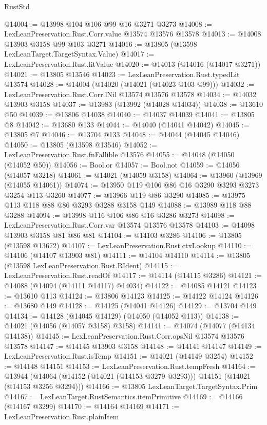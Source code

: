 \begin{lexlean}{RustStd}
\begin{coremodule}
@14004 := @13998 @104 @106 @99 @16 @3271 @3273
@14008 := LexLeanPreservation.Rust.Corr.value @13574 @13576 @13578
@14013 := @14008 @13903 @3158 @99 @103 @3271
@14016 := @13805 (@13598 LexLeanTarget.TargetSyntax.Value)
@14017 := LexLeanPreservation.Rust.litValue
@14020 := @14013 (@14016 (@14017 @3271))
@14021 := @13805 @13546
@14023 := LexLeanPreservation.Rust.typedLit @13574
@14028 := @14004 (@14020 (@14021 (@14023 @103 @99)))
@14032 := LexLeanPreservation.Rust.Corr.lNil @13574 @13576 @13578
@14034 := @14032 @13903 @3158
@14037 := @13983 (@13992 (@14028 @14034))
@14038 := @13610 @50
@14039 := @13806 @14038
@14040 := @14037 @14039
@14041 := @13805 @8
@14042 := @13680 @133
@14044 := @14040 (@14041 @14042)
@14045 := @13805 @7
@14046 := @13704 @133
@14048 := @14044 (@14045 @14046)
@14050 := @13805 (@13598 @13546)
@14052 := LexLeanPreservation.Rust.fnFallible @13576
@14055 := @14048 (@14050 (@14052 @50))
@14056 := Bool.or
@14057 := Bool.not
@14059 := @14056 (@14057 @3218)
@14061 := @14021 (@14059 @3158)
@14064 := @13960 (@13969 (@14055 @14061))
@14074 := @13950 @119 @106 @86 @16 @3290 @3293 @3273 @3254 @113 @3260
@14077 := @13966 @119 @86 @3290
@14085 := @13975 @113 @118 @88 @86 @3293 @3288 @3158 @149
@14088 := @13989 @118 @88 @3288
@14094 := @13998 @116 @106 @86 @16 @3286 @3273
@14098 := LexLeanPreservation.Rust.Corr.var @13574 @13576 @13578
@14103 := @14098 @13903 @3158 @81 @86 @81
@14104 := @14103 @3286
@14106 := @13805 (@13598 @13672)
@14107 := LexLeanPreservation.Rust.ctxLookup
@14110 := @14106 (@14107 @13903 @81)
@14111 := @14104 @14110
@14114 := @13805 (@13598 LexLeanPreservation.Rust.RIdent)
@14115 := LexLeanPreservation.Rust.readOf
@14117 := @14114 (@14115 @3286)
@14121 := @14088 (@14094 (@14111 @14117) @14034)
@14122 := @14085 @14121
@14123 := @13610 @113
@14124 := @13806 @14123
@14125 := @14122 @14124
@14126 := @13680 @149
@14128 := @14125 (@14041 @14126)
@14129 := @13704 @149
@14134 := @14128 (@14045 @14129) (@14050 (@14052 @113))
@14138 := @14021 (@14056 (@14057 @3158) @3158)
@14141 := @14074 (@14077 (@14134 @14138))
@14145 := LexLeanPreservation.Rust.Corr.opsNil @13574 @13576 @13578
@14147 := @14145 @13903 @3158
@14148 := @14141 @14147
@14149 := LexLeanPreservation.Rust.isTemp
@14151 := @14021 (@14149 @3254)
@14152 := @14148 @14151
@14153 := LexLeanPreservation.Rust.tempFresh
@14164 := @13944
    (@14064 (@14152 (@14021 (@14153 @3279 @3293))) @14151 (@14021 (@14153 @3256 @3294)))
@14166 := @13805 LexLeanTarget.TargetSyntax.Prim
@14167 := LexLeanTarget.RustSemantics.itemPrimitive
@14169 := @14166 (@14167 @3299)
@14170 := @14164 @14169
@14171 := LexLeanPreservation.Rust.plainItem

\end{coremodule}
\end{lexlean}
